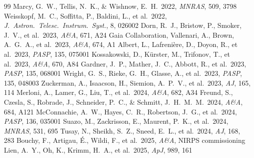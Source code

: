 \documentclass[twocolumn,10pt]{article}
\begin{document}
\begin{thebibliography}{99}
 Marcy, G.~W., Tellis, N.~K., \& Wishnow, E.~H.\ 2022, \textit{MNRAS}, 509, 3798
 Weisskopf, M.~C., Soffitta, P., Baldini, L., et al.\ 2022, \textit{J.\ Astron.\ Telesc.\ Instrum.\ Syst.}, 8, 026002
 Dorn, R.~J., Bristow, P., Smoker, J.~V., et al.\ 2023, \textit{A\&A}, 671, A24
 Gaia Collaboration, Vallenari, A., Brown, A.~G.~A., et al.\ 2023, \textit{A\&A}, 674, A1
 Albert, L., Lafreni\`{e}re, D., Doyon, R., et al.\ 2023, \textit{PASP}, 135, 075001
 Kossakowski, D., K\"{u}rster, M., Trifonov, T., et al.\ 2023, \textit{A\&A}, 670, A84
 Gardner, J.~P., Mather, J.~C., Abbott, R., et al.\ 2023, \textit{PASP}, 135, 068001
 Wright, G.~S., Rieke, G.~H., Glasse, A., et al.\ 2023, \textit{PASP}, 135, 048003
 Zuckerman, A., Isaacson, H., Siemion, A.~P.~V., et al.\ 2023, \textit{AJ}, 165, 114
 Merloni, A., Lamer, G., Liu, T., et al.\ 2024, \textit{A\&A}, 682, A34
 Freund, S., Czesla, S., Robrade, J., Schneider, P.~C., \& Schmitt, J.~H.~M.~M.\ 2024, \textit{A\&A}, 684, A121
 McConnachie, A.~W., Hayes, C.~R., Robertson, J.~G., et al.\ 2024, \textit{PASP}, 136, 035001
 Suazo, M., Zackrisson, E., Maurent, P.~K., et al.\ 2024, \textit{MNRAS}, 531, 695
 Tusay, N., Sheikh, S.~Z., Sneed, E.~L., et al.\ 2024, \textit{AJ}, 168, 283
 Bouchy, F., Artigau, \'{E}., Wildi, F., et al.\ 2025, \textit{A\&A}, NIRPS commissioning
 Lien, A.~Y., Oh, K., Krimm, H.~A., et al.\ 2025, \textit{ApJ}, 989, 161
\end{thebibliography}
\end{document}
